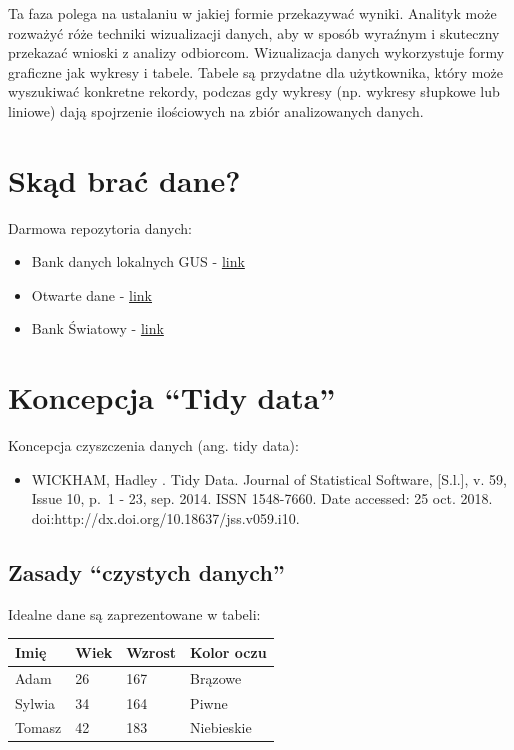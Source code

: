\documentclass[
  polish,
  letterpaper,
  DIV=11,
  numbers=noendperiod]{scrreprt}
\newcounter{none} %
\providecommand{\tightlist}{%
  \setlength{\itemsep}{0pt}\setlength{\parskip}{0pt}}
\begin{document}
Ta faza polega na ustalaniu w jakiej formie przekazywać wyniki. Analityk
może rozważyć róże techniki wizualizacji danych, aby w sposób wyraźnym i
skuteczny przekazać wnioski z analizy odbiorcom. Wizualizacja danych
wykorzystuje formy graficzne jak wykresy i tabele. Tabele są przydatne
dla użytkownika, który może wyszukiwać konkretne rekordy, podczas gdy
wykresy (np. wykresy słupkowe lub liniowe) dają spojrzenie ilościowych
na zbiór analizowanych danych.

\section{Skąd brać dane?}\label{skux105d-braux107-dane}

Darmowa repozytoria danych:

\begin{itemize}
\tightlist
\item
  Bank danych lokalnych GUS -
  \href{https://bdl.stat.gov.pl/BDL/start}{link}
\item
  Otwarte dane - \href{https://dane.gov.pl/}{link}
\item
  Bank Światowy - \href{https://data.worldbank.org/}{link}
\end{itemize}

\section{Koncepcja ``Tidy data''}\label{koncepcja-tidy-data}

Koncepcja czyszczenia danych (ang. tidy data):

\begin{itemize}
\tightlist
\item
  WICKHAM, Hadley . Tidy Data. Journal of Statistical Software,
  {[}S.l.{]}, v. 59, Issue 10, p.~1 - 23, sep. 2014. ISSN 1548-7660.
  Date accessed: 25 oct. 2018.
  doi:http://dx.doi.org/10.18637/jss.v059.i10.
\end{itemize}

\subsection{Zasady ``czystych danych''}\label{zasady-czystych-danych}

Idealne dane są zaprezentowane w tabeli:

{\def\LTcaptype{none} %
\begin{longtable}[]{@{}llll@{}}
\toprule\noalign{}
Imię & Wiek & Wzrost & Kolor oczu \\
\midrule\noalign{}
\endhead
\bottomrule\noalign{}
\endlastfoot
Adam & 26 & 167 & Brązowe \\
Sylwia & 34 & 164 & Piwne \\
Tomasz & 42 & 183 & Niebieskie \\
\end{longtable}
}
\end{document}
